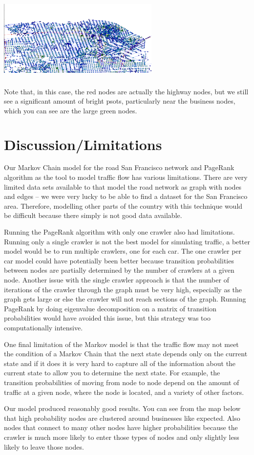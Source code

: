 \documentclass{article}
\begin{document}
 \includegraphics[width=8cm,height=5cm]{../figs/f3} \\
Note that, in this case, the red nodes are actually the highway nodes, but we still see a significant amount of bright psots, particularly near the business nodes, which you can see are the large green nodes.

\section{Discussion/Limitations}
Our Markov Chain model for the road San Francisco network and PageRank algorithm as the tool to model traffic flow has various limitations. There are very limited data sets available to that model the road network as graph with nodes and edges – we were very lucky to be able to find a dataset for the San Francisco area.  Therefore, modelling other parts of the country with this technique would be difficult because there simply is not good data available. 

Running the PageRank algorithm with only one crawler also had limitations. Running only a single crawler is not the best model for simulating traffic, a better model would be to run multiple crawlers, one for each car. The one crawler per car model could have potentially been better because transition probabilities between nodes are partially determined by the number of crawlers at a given node. Another issue with the single crawler approach is that the number of iterations of the crawler through the graph must be very high, especially as the graph gets large or else the crawler will not reach sections of the graph. Running PageRank by doing eigenvalue decomposition on a matrix of transition probabilities would have avoided this issue, but this strategy was too computationally intensive. 

One final limitation of the Markov model is that the traffic flow may not meet the condition of a Markov Chain that the next state depends only on the current state and if it does it is very hard to capture all of the information about the current state to allow you to determine the next state.  For example, the transition probabilities of moving from node to node depend on the amount of traffic at a given node, where the node is located, and a variety of other factors. 

Our model produced reasonably good results. You can see from the map below that high probability nodes are clustered around businesses like expected. Also nodes that connect to many other nodes have higher probabilities because the crawler is much more likely to enter those types of nodes and only slightly less likely to leave those nodes.
\end{document}
